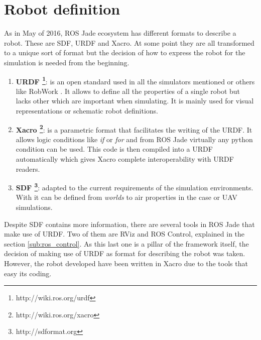 \section{Robot definition} %
\label{sec:robot_definition}
As in May of 2016, ROS Jade ecosystem has different formats to describe a robot.
These are SDF, URDF and Xacro.
At some point they are all transformed to a unique sort of format but the decision of how to express the robot for the simulation is needed from the beginning.


\begin{enumerate}
  \item \textbf{URDF \footnote{http://wiki.ros.org/urdf}}: is an open standard used in all the simulators mentioned or others like RobWork \cite{robwork}. 
  It allows to define all the properties of a single robot but lacks other which are important when simulating. 
  It is mainly used for visual representations or schematic robot definitions.
  \item \textbf{Xacro \footnote{http://wiki.ros.org/xacro}}: is a parametric format that facilitates the writing of the URDF.
  It allows logic conditions like \textit{if} or \textit{for} and from ROS Jade  virtually any python condition can be used.
  This code is then compiled into a URDF automatically which gives Xacro complete interoperability with URDF readers.
  \item \textbf{SDF \footnote{http://sdformat.org}}: adapted to the current requirements of the simulation environments.
  With it can be defined from \textit{worlds} to air properties in the case or UAV simulations.
\end{enumerate}

Despite SDF contains more information, there are several tools in ROS Jade that make use of URDF.
Two of them are RViz and ROS Control, explained in the section \ref{sub:ros_control}.
As this last one is a pillar of the framework itself, the decision of making use of URDF as format for describing the robot was taken.
However, the robot developed have been written in Xacro due to the tools that easy its coding.
